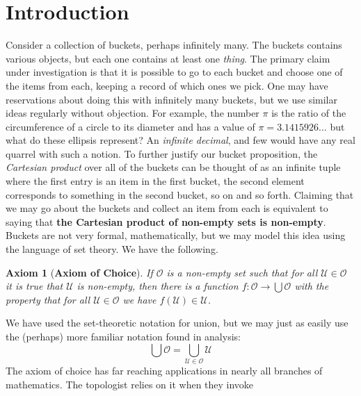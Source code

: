 \documentclass{article}
\newtheorem{axiom}{Axiom}
\begin{document}
    \section{Introduction}
        Consider a collection of buckets, perhaps infinitely many. The buckets
        contains various objects, but each one contains at least one
        \textit{thing}. The primary claim under investigation is that it is
        possible to go to each bucket and choose one of the items from
        each, keeping a record of which ones we pick. One may have reservations
        about doing this with infinitely many buckets, but we use similar ideas
        regularly without objection. For example, the number $\pi$ is the
        ratio of the circumference of a circle to its diameter and has a
        value of $\pi=3.1415926\dots$ but what do these ellipsis represent?
        An \textit{infinite decimal}, and few would have any real quarrel
        with such a notion. To further justify our bucket proposition,
        the \textit{Cartesian product} over all of the buckets can be thought
        of as an infinite tuple where the first entry is an item in the
        first bucket, the second element corresponds to something in the
        second bucket, so on and so forth. Claiming that we may go about the
        buckets and collect an item from each is equivalent to saying that
        \textbf{the Cartesian product of non-empty sets is non-empty}. Buckets
        are not very formal, mathematically, but we may model this idea using
        the language of set theory. We have the following.
        \begin{axiom}[\textbf{Axiom of Choice}]
            If $\mathcal{O}$ is a non-empty set such that for all
            $\mathcal{U}\in\mathcal{O}$ it is true that $\mathcal{U}$ is
            non-empty, then there is a function
            $f:\mathcal{O}\rightarrow\bigcup\mathcal{O}$ with the property
            that for all
            $\mathcal{U}\in\mathcal{O}$ we have $f(\mathcal{U})\in\mathcal{U}$.
        \end{axiom}
        We have used the set-theoretic notation for union, but we may just as
        easily use the (perhaps) more familiar notation found in analysis:
        \begin{equation}
            \bigcup\mathcal{O}
            =\bigcup_{\mathcal{U}\in\mathcal{O}}\mathcal{U}
        \end{equation}
        The axiom of choice has far reaching applications in nearly all
        branches of mathematics. The topologist relies on it when they invoke
\end{document}
